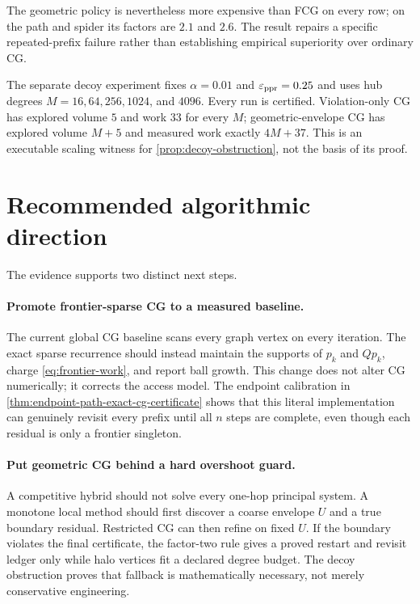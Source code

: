 \documentclass[11pt]{article}
\begin{document}
The geometric policy is nevertheless more expensive than FCG on every row;
on the path and spider its factors are $2.1$ and $2.6$. The result repairs a
specific repeated-prefix failure rather than establishing empirical
superiority over ordinary CG.

The separate decoy experiment fixes $\alpha=0.01$ and $\varepsilon_{\mathrm{ppr}}=0.25$ and uses
hub degrees $M=16,64,256,1024$, and $4096$. Every run is certified. Violation-only
CG has explored volume $5$ and work $33$ for every $M$; geometric-envelope CG
has explored volume $M+5$ and measured work exactly $4M+37$. This is an
executable scaling witness for \cref{prop:decoy-obstruction}, not the basis of
its proof.

\section{Recommended algorithmic direction}
\label{sec:direction}

The evidence supports two distinct next steps.

\paragraph{Promote frontier-sparse CG to a measured baseline.}
The current global CG baseline scans every graph vertex on every iteration.
The exact sparse recurrence should instead maintain the supports of $p_k$ and
$Qp_k$, charge \cref{eq:frontier-work}, and report ball growth. This change
does not alter CG numerically; it corrects the access model.  The endpoint
calibration in \cref{thm:endpoint-path-exact-cg-certificate} shows that this
literal implementation can genuinely revisit every prefix until all $n$
steps are complete, even though each residual is only a frontier singleton.

\paragraph{Put geometric CG behind a hard overshoot guard.}
A competitive hybrid should not solve every one-hop principal system. A
monotone local method should first discover a coarse envelope $U$ and a true
boundary residual. Restricted CG can then refine on fixed $U$. If the
boundary violates the final certificate, the factor-two rule gives a proved
restart and revisit ledger only while halo vertices fit a declared degree
budget. The decoy obstruction proves that fallback is mathematically
necessary, not merely conservative engineering.
\end{document}
